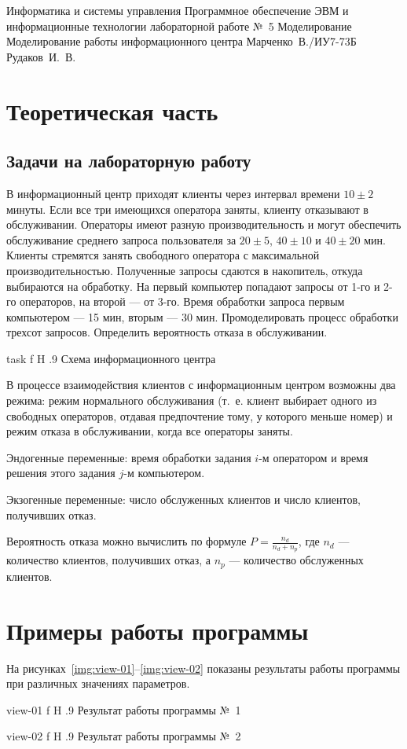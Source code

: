 \documentclass{bmstu}
\begin{document}
\makereporttitle
    {Информатика и системы управления}
    {Программное обеспечение ЭВМ и информационные технологии}
    {лабораторной работе №~5}
    {Моделирование}
    {Моделирование работы информационного центра}
    {}
    {Марченко~В./ИУ7-73Б} %
    {Рудаков~И.~В.}

{\centering \maketableofcontents}

\chapter{Теоретическая часть}

\section{Задачи на лабораторную работу}

В информационный центр приходят клиенты через интервал времени $10 \pm 2$ минуты. 
Если все три имеющихся оператора заняты, клиенту отказывают в обслуживании. 
Операторы имеют разную производительность и могут обеспечить обслуживание среднего запроса пользователя за $20 \pm 5$, $40 \pm 10$ и $40 \pm 20$ мин. 
Клиенты стремятся занять свободного оператора с максимальной производительностью. 
Полученные запросы сдаются в накопитель, откуда выбираются на обработку. 
На первый компьютер попадают запросы от 1-го и 2-го операторов, на второй --- от 3-го. 
Время обработки запроса первым компьютером --- 15 мин, вторым --- 30 мин. 
Промоделировать процесс обработки трехсот запросов. 
Определить вероятность отказа в обслуживании.

    {task}
    {f}
    {H}
    {.9\textwidth}
    {Схема информационного центра}

В процессе взаимодействия клиентов с информационным центром возможны два режима: режим нормального обслуживания (т.~е. клиент выбирает одного из свободных операторов, отдавая предпочтение тому, у которого меньше номер) и режим отказа в обслуживании, когда все операторы заняты.

Эндогенные переменные: время обработки задания $i$-м оператором и время решения этого задания $j$-м компьютером.

Экзогенные переменные: число обслуженных клиентов и число клиентов, получивших отказ.

Вероятность отказа можно вычислить по формуле $P = \frac{n_{d}}{n_{d} + n_{p}}$, где $n_{d}$ --- количество клиентов, получивших отказ, а $n_{p}$ --- количество обслуженных клиентов.

\chapter{Примеры работы программы}

На рисунках~\ref{img:view-01}--\ref{img:view-02} показаны результаты работы программы при различных значениях параметров.

    {view-01}
    {f}
    {H}
    {.9\textwidth}
    {Результат работы программы №~1}
    
    {view-02}
    {f}
    {H}
    {.9\textwidth}
    {Результат работы программы №~2}
\end{document}
